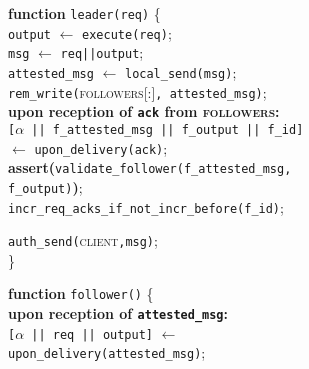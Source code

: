 \noindent{}


\begin{algorithm}
\SetAlgoLined
\small
\textbf{function} \texttt{leader(req)} \{ \\
\Indp
 {\tt output} $\leftarrow$ \texttt{execute(req)};\\
 {\tt msg} $\leftarrow$ \texttt{req||output};\\
 {\tt attested\_msg} $\leftarrow$ \texttt{local\_send(msg)};\\
 \texttt{rem\_write(}\textsc{followers[:]}{\tt, attested\_msg)};\\

{\bf upon reception of {\tt ack} from \textsc{followers}:}\\
    \Indp
        {\tt [{$\alpha$ || f\_attested\_msg || f\_output || f\_id}]} \\\hspace{22pt} $\leftarrow$ \texttt{upon\_delivery(ack)};\\
        {\bf assert(}\texttt{validate\_follower(f\_attested\_msg,\\\hspace{22pt} f\_output)}{\bf)};\\
        \texttt{incr\_req\_acks\_if\_not\_incr\_before(f\_id)};\\
    \Indm

 \texttt{auth\_send(}\textsc{client}{\tt,msg)};\\
\Indm
\} \\

\vspace{0.15cm}

\textbf{function} \texttt{follower()} \{ \\
\Indp
{\bf upon reception of {\tt attested\_msg}:}\\
    \Indp
        {\tt [{$\alpha$ || req || output}]} $\leftarrow$ \\\hspace{22pt}\texttt{upon\_delivery(attested\_msg)};\\


\end{algorithm}
